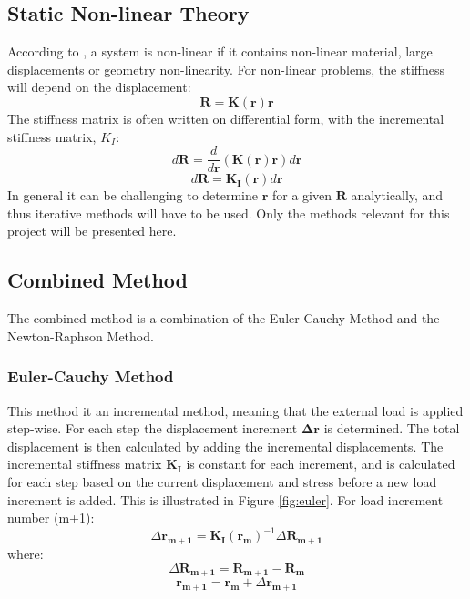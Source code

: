 \subsection{Static Non-linear Theory}
According to \cite{moan2003}, a system is non-linear if it contains non-linear material, large displacements or geometry non-linearity. For non-linear problems, the stiffness will depend on the displacement:
\begin{equation}
    \boldsymbol{R}=\boldsymbol{K(r)}\boldsymbol{r}
\end{equation}
The stiffness matrix is often written on differential form, with the incremental stiffness matrix, $K_I$:
\begin{equation}
    d\boldsymbol{R}=\frac{d}{d\boldsymbol{r}}(\boldsymbol{K(r)r})d\boldsymbol{r}
\end{equation}
\begin{equation}
  d\boldsymbol{R}= \boldsymbol{K_I(r)}d\boldsymbol{r}
  \label{eq:system}
\end{equation}
In general it can be challenging to determine $\boldsymbol{r}$ for a given $\boldsymbol{R}$ analytically, and thus iterative methods will have to be used. Only the methods relevant for this project will be presented here. 

\subsection{Combined Method}
The combined method is a combination of the Euler-Cauchy Method and the Newton-Raphson Method. 
\subsubsection{Euler-Cauchy Method}
This method it an incremental method, meaning that the external load is applied step-wise. For each step the displacement increment $\boldsymbol{\Delta r}$ is determined. The total displacement is then calculated by adding the incremental displacements. The incremental stiffness matrix $\boldsymbol{K_I}$ is constant for each increment, and is calculated for each step based on the current displacement and stress before a new load increment is added. This is illustrated in Figure \ref{fig:euler}. For load increment number (m+1):
\begin{equation}
\Delta \boldsymbol{r_{m+1}}= \boldsymbol{K_{I}}(\boldsymbol{r_{m}})^{-1} \Delta \boldsymbol{R_{m+1}}
\end{equation}
\newline 
\newline
where:
\begin{equation}
    \Delta \boldsymbol{R_{m+1}} = \boldsymbol{R_{m+1}} - \boldsymbol{R_{m}}
\end{equation}
\begin{equation}
    \boldsymbol{r_{m+1}}=\boldsymbol{r_{m}}+\Delta \boldsymbol{r_{m+1}}
\end{equation}

